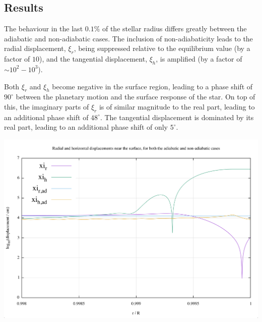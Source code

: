 \documentclass[a0,portrait]{a0poster}
\begin{document}
\begin{multicols}{2}
\begin{tcolorbox}[colframe=black,colback=blue!10!white]
\vspace{0.5cm}

\section*{Results}

The behaviour in the last $0.1\%$ of the stellar radius differs greatly between the adiabatic and non-adiabatic cases. The inclusion of non-adiabaticity leads to the radial displacement, $\xi_{r}$, being suppressed relative to the equilibrium value (by a factor of $10$), and the tangential displacement, $\xi_{h}$, is amplified (by a factor of $\sim 10^{2} - 10^{3}$).

Both $\xi_{r}$ and $\xi_{h}$ become negative in the surface region, leading to a phase shift of $90^{\circ}$ between the planetary motion and the surface response of the star. On top of this, the imaginary parts of $\xi_{r}$ is of similar magnitude to the real part, leading to an additional phase shift of $48^{\circ}$. The tangential displacement is dominated by its real part, leading to an additional phase shift of only $5^{\circ}$.

\begin{center}\vspace{1cm}
\includegraphics[width=0.95\linewidth]{poster_displacements}
\end{center}\vspace{1cm}


\end{tcolorbox}
\end{multicols}
\end{document}

